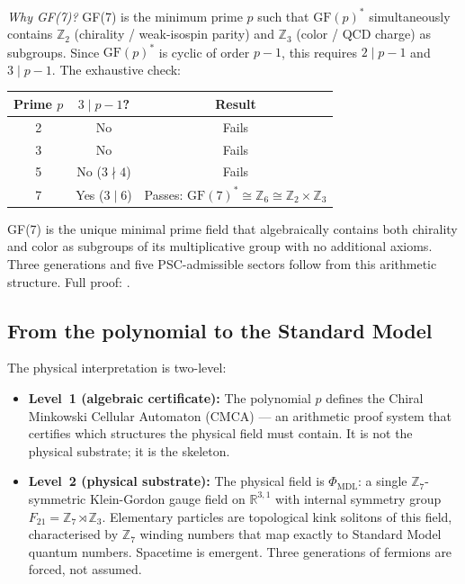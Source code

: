 \documentclass[11pt]{article}
\theoremstyle{remark}
\newcommand{\PHIMDL}{\Phi_{\mathrm{MDL}}}
\begin{document}
\medskip
\noindent\textit{Why GF(7)?}
GF(7) is the minimum prime $p$ such that $\mathrm{GF}(p)^*$ simultaneously contains
$\mathbb{Z}_2$ (chirality / weak-isospin parity) and $\mathbb{Z}_3$ (color /
QCD charge) as subgroups. Since $\mathrm{GF}(p)^*$ is cyclic of order $p-1$, this
requires $2 \mid p-1$ and $3 \mid p-1$. The exhaustive check:

\begin{center}\small
\begin{tabular}{ccc}
\toprule
Prime $p$ & $3 \mid p-1$? & Result \\
\midrule
2 & No & Fails \\
3 & No & Fails \\
5 & No ($3 \nmid 4$) & Fails \\
7 & Yes ($3 \mid 6$) & Passes: $\mathrm{GF}(7)^* \cong \mathbb{Z}_6 \cong \mathbb{Z}_2 \times \mathbb{Z}_3$ \\
\bottomrule
\end{tabular}
\end{center}

\noindent GF(7) is the unique minimal prime field that algebraically contains both
chirality and color as subgroups of its multiplicative group with no additional axioms.
Three generations and five PSC-admissible sectors follow from this arithmetic structure.
Full proof: \cite{SpivackGTECompleteFramework}.

\subsection{From the polynomial to the Standard Model}

The physical interpretation is two-level:

\begin{itemize}
  \item \textbf{Level~1 (algebraic certificate):} The polynomial $p$ defines the
    Chiral Minkowski Cellular Automaton (CMCA) --- an arithmetic proof system that
    certifies which structures the physical field must contain. It is not the physical
    substrate; it is the skeleton.

  \item \textbf{Level~2 (physical substrate):} The physical field is $\PHIMDL$: a
    single $\mathbb{Z}_7$-symmetric Klein-Gordon gauge field on $\mathbb{R}^{3,1}$
    with internal symmetry group $F_{21} = \mathbb{Z}_7 \rtimes \mathbb{Z}_3$.
    Elementary particles are topological kink solitons of this field, characterised
    by $\mathbb{Z}_7$ winding numbers that map exactly to Standard Model quantum
    numbers. Spacetime is emergent. Three generations of fermions are forced, not assumed.
\end{itemize}
\end{document}
